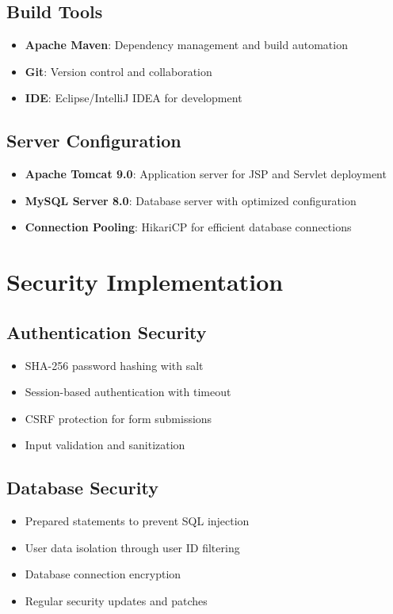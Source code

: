 \subsection{Build Tools}
\begin{itemize}
    \item \textbf{Apache Maven}: Dependency management and build automation
    \item \textbf{Git}: Version control and collaboration
    \item \textbf{IDE}: Eclipse/IntelliJ IDEA for development
\end{itemize}

\subsection{Server Configuration}
\begin{itemize}
    \item \textbf{Apache Tomcat 9.0}: Application server for JSP and Servlet deployment
    \item \textbf{MySQL Server 8.0}: Database server with optimized configuration
    \item \textbf{Connection Pooling}: HikariCP for efficient database connections
\end{itemize}

\section{Security Implementation}

\subsection{Authentication Security}
\begin{itemize}
    \item SHA-256 password hashing with salt
    \item Session-based authentication with timeout
    \item CSRF protection for form submissions
    \item Input validation and sanitization
\end{itemize}

\subsection{Database Security}
\begin{itemize}
    \item Prepared statements to prevent SQL injection
    \item User data isolation through user ID filtering
    \item Database connection encryption
    \item Regular security updates and patches
\end{itemize}